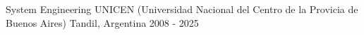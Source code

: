 \begin{cventries}
\cventry
{System Engineering} %
{UNICEN (Universidad Nacional del Centro de la Provicia de Buenos Aires)} %
{Tandil, Argentina} %
{2008 - 2025} %
{ %
}
\end{cventries}
